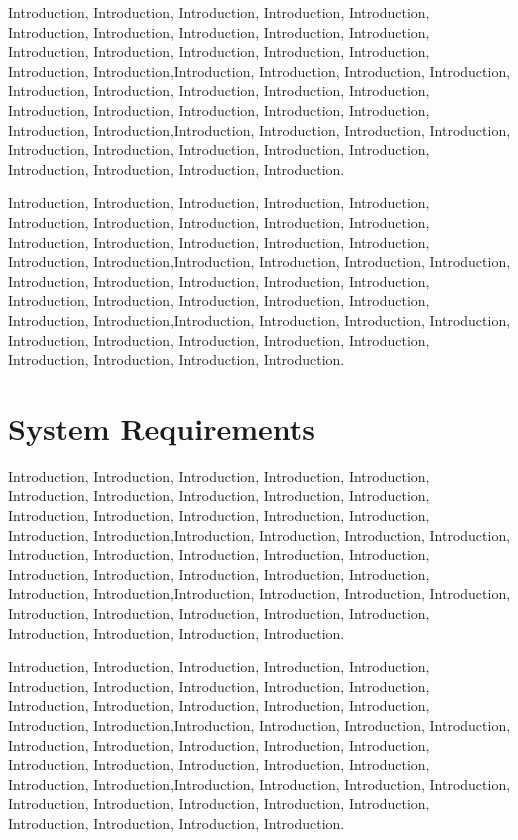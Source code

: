 Introduction, Introduction, Introduction, Introduction\cite{welch1967use}, Introduction, Introduction, Introduction, Introduction, Introduction, Introduction, Introduction, Introduction, Introduction, Introduction, Introduction, Introduction, Introduction,Introduction, Introduction, Introduction, Introduction, Introduction, Introduction, Introduction, Introduction, Introduction, Introduction, Introduction, Introduction, Introduction, Introduction, Introduction, Introduction,Introduction, Introduction, Introduction, Introduction, Introduction, Introduction, Introduction, Introduction, Introduction, Introduction, Introduction, Introduction, Introduction.

Introduction, Introduction, Introduction, Introduction, Introduction, Introduction, Introduction, Introduction, Introduction, Introduction, Introduction, Introduction, Introduction, Introduction, Introduction, Introduction, Introduction,Introduction, Introduction, Introduction, Introduction, Introduction, Introduction, Introduction, Introduction, Introduction, Introduction, Introduction, Introduction, Introduction, Introduction, Introduction, Introduction,Introduction, Introduction, Introduction, Introduction, Introduction, Introduction, Introduction, Introduction, Introduction, Introduction, Introduction, Introduction, Introduction.

\section{System Requirements}

Introduction, Introduction, Introduction, Introduction, Introduction, Introduction, Introduction, Introduction, Introduction, Introduction, Introduction, Introduction, Introduction, Introduction, Introduction, Introduction, Introduction,Introduction, Introduction, Introduction, Introduction, Introduction, Introduction, Introduction, Introduction, Introduction, Introduction, Introduction, Introduction, Introduction, Introduction, Introduction, Introduction,Introduction, Introduction, Introduction, Introduction, Introduction, Introduction, Introduction, Introduction, Introduction, Introduction, Introduction, Introduction, Introduction.

Introduction, Introduction, Introduction, Introduction, Introduction, Introduction, Introduction, Introduction, Introduction, Introduction, Introduction, Introduction, Introduction, Introduction, Introduction, Introduction, Introduction,Introduction, Introduction, Introduction, Introduction, Introduction, Introduction, Introduction, Introduction, Introduction, Introduction, Introduction, Introduction, Introduction, Introduction, Introduction, Introduction,Introduction, Introduction, Introduction, Introduction, Introduction, Introduction, Introduction, Introduction, Introduction, Introduction, Introduction, Introduction, Introduction.

